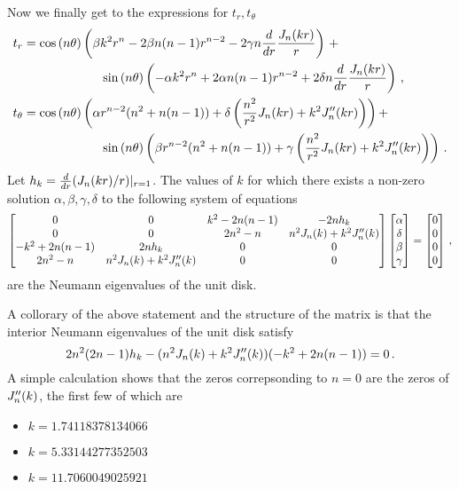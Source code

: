 Now we finally get to the expressions for $t_{r},t_{\theta}$ 
\begin{equation}
\begin{aligned}
t_{r} &= \cost \left( \beta k^2 r^{n} -2\beta n(n-1)r^{n-2} - 2\gamma n \ddr \frac{\jnkr}{r}  \right) \, + \\
& \hspace*{15ex} \sint \left(-\alpha k^2 r^{n} + 2 \alpha n(n-1)r^{n-2} + 2 \delta n \ddr \frac{\jnkr}{r} \right) \, , \\
t_{\theta} &= \cost \left( \alpha r^{n-2} (n^2 + n(n-1)) + \delta \left( \frac{n^2}{r^2} \jnkr + k^2 \jnppkr \right)  \right) + \\
& \hspace*{15ex} \sint \left( \beta r^{n-2} (n^2 + n(n-1)) + \gamma \left( \frac{n^2}{r^2} \jnkr + k^2 \jnppkr \right) \right) \, .
\end{aligned}
\end{equation}
Let $h_{k} = \frac{d}{dr} (J_{n}(kr)/r)|_{r=1}$.
The values of $k$ for which there exists a non-zero solution $\alpha,\beta,\gamma,\delta$ 
to the following system of equations
\begin{equation}
\begin{bmatrix}
0 & 0 & k^2 - 2n(n-1) & -2nh_{k} \\
0 & 0 & 2n^2 -n & n^2 J_{n}(k) + k^2 J_{n}''(k) \\
-k^2 + 2n(n-1) & 2nh_{k} & 0 & 0 \\
2n^2 -n & n^2 J_{n}(k) + k^2 J_{n}''(k) & 0 & 0
\end{bmatrix}
\begin{bmatrix}
\alpha \\ \delta \\ \beta \\ \gamma
\end{bmatrix}
=
\begin{bmatrix}
0 \\ 0 \\ 0 \\ 0
\end{bmatrix}
\, ,
\end{equation}
are the Neumann eigenvalues of the unit disk.

A collorary of the above statement and the structure of the matrix is that
the interior Neumann eigenvalues of the unit disk satisfy
\begin{equation}
2n^2(2n-1)h_{k} - (n^2 J_{n}(k) + k^2 J_{n}''(k))(-k^2 + 2n(n-1)) = 0 \, .
\end{equation}
A simple calculation shows that the zeros correpsonding to
$n=0$ are the zeros of $J_{n}''(k)$, the first few of which are
\begin{itemize}
\item $k = 1.74118378134066$
\item $k = 5.33144277352503$
\item $k = 11.7060049025921$
\end{itemize}
